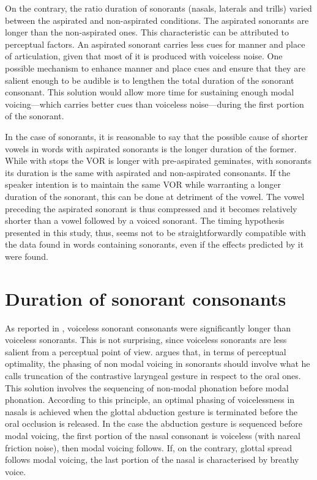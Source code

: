 \documentclass[11pt,a4paper,oneside,openany]{memoir}\usepackage[]{graphicx}\usepackage[]{color}
\begin{document}
On the contrary, the ratio duration of sonorants (nasals, laterals and trills) varied between the aspirated and non-aspirated conditions.
The aspirated sonorants are longer than the non-aspirated ones.
This characteristic can be attributed to perceptual factors.
An aspirated sonorant carries less cues for manner and place of articulation, given that most of it is produced with voiceless noise.
One possible mechanism to enhance manner and place cues and ensure that they are salient enough to be audible is to lengthen the total duration of the sonorant consonant.
This solution would allow more time for sustaining enough modal voicing---which carries better cues than voiceless noise---during the first portion of the sonorant.

In the case of sonorants, it is reasonable to say that the possible cause of shorter vowels in words with aspirated sonorants is the longer duration of the former.
While with stops the VOR is longer with pre-aspirated geminates, with sonorants its duration is the same with aspirated and non-aspirated consonants.
If the speaker intention is to maintain the same VOR while warranting a longer duration of the sonorant, this can be done at detriment of the vowel.
The vowel preceding the aspirated sonorant is thus compressed and it becomes relatively shorter than a vowel followed by a voiced sonorant.
The timing hypothesis presented in this study, thus, seems not to be straightforwardly compatible with the data found in words containing sonorants, even if the effects predicted by it were found.

\section{Duration of sonorant consonants}

As reported in , voiceless sonorant consonants were significantly longer than voiceless sonorants.
This is not surprising, since voiceless sonorants are less salient from a perceptual point of view.
\citet{silverman1997} argues that, in terms of perceptual optimality, the phasing of non modal voicing in sonorants should involve what he calls truncation of the contrastive laryngeal gesture in respect to the oral ones.
This solution involves the sequencing of non-modal phonation before modal phonation.
According to this principle, an optimal phasing of voicelessness in nasals is achieved when the glottal abduction gesture is terminated before the oral occlusion is released.
In the case the abduction gesture is sequenced before modal voicing, the first portion of the nasal consonant is voiceless (with nareal friction noise), then modal voicing follows.
If, on the contrary, glottal spread follows modal voicing, the last portion of the nasal is characterised by breathy voice.
\end{document}
